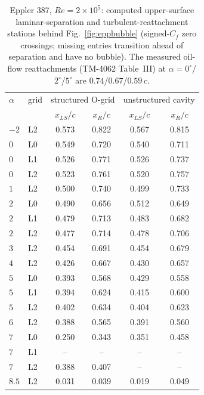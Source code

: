 \begin{table}[tp]
  \centering\small
  \caption{Eppler 387, $Re\!=\!2\!\times\!10^5$: computed upper-surface laminar-separation and turbulent-reattachment stations behind Fig.~\ref{fig:eppbubble} (signed-$C_f$ zero crossings; missing entries transition ahead of separation and have no bubble). The measured oil-flow reattachments (TM-4062 Table~III) at $\alpha\!=\!0^\circ$/$2^\circ$/$5^\circ$ are $0.74$/$0.67$/$0.59\,c$.}
  \label{tab:data_eppbubble}
  \begin{tabular}{ll cc cc}
    \toprule
    $\alpha$ & grid & \multicolumn{2}{c}{structured O-grid} & \multicolumn{2}{c}{unstructured cavity} \\ & & $x_{LS}/c$ & $x_R/c$ & $x_{LS}/c$ & $x_R/c$ \\
    \midrule
    $-2$ & L2 & 0.573 & 0.822 & 0.567 & 0.815 \\
    $0$ & L0 & 0.549 & 0.720 & 0.540 & 0.711 \\
    $0$ & L1 & 0.526 & 0.771 & 0.526 & 0.737 \\
    $0$ & L2 & 0.523 & 0.761 & 0.520 & 0.757 \\
    $1$ & L2 & 0.500 & 0.740 & 0.499 & 0.733 \\
    $2$ & L0 & 0.490 & 0.656 & 0.512 & 0.649 \\
    $2$ & L1 & 0.479 & 0.713 & 0.483 & 0.682 \\
    $2$ & L2 & 0.477 & 0.714 & 0.478 & 0.706 \\
    $3$ & L2 & 0.454 & 0.691 & 0.454 & 0.679 \\
    $4$ & L2 & 0.426 & 0.667 & 0.430 & 0.657 \\
    $5$ & L0 & 0.393 & 0.568 & 0.429 & 0.558 \\
    $5$ & L1 & 0.394 & 0.624 & 0.415 & 0.600 \\
    $5$ & L2 & 0.402 & 0.634 & 0.404 & 0.623 \\
    $6$ & L2 & 0.388 & 0.565 & 0.391 & 0.560 \\
    $7$ & L0 & 0.250 & 0.343 & 0.351 & 0.458 \\
    $7$ & L1 & -- & -- & -- & -- \\
    $7$ & L2 & 0.388 & 0.407 & -- & -- \\
    $8.5$ & L2 & 0.031 & 0.039 & 0.019 & 0.049 \\
    \bottomrule
  \end{tabular}
\end{table}
